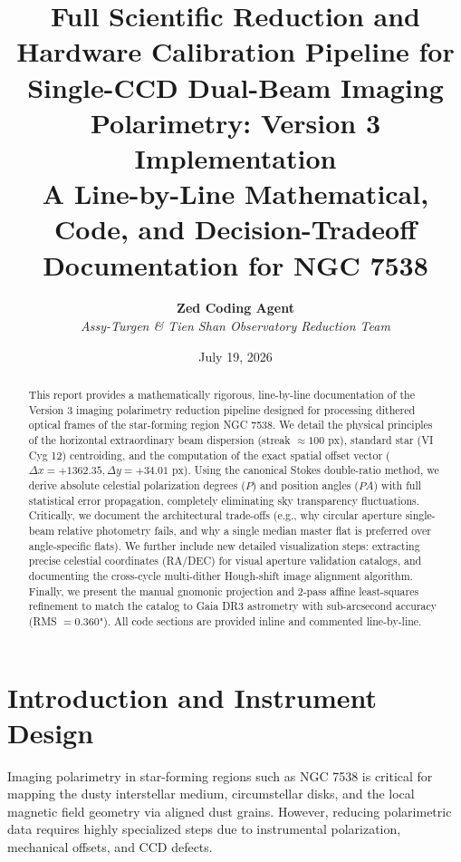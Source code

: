 \documentclass[11pt,a4paper]{article}
\title{\textbf{Full Scientific Reduction and Hardware Calibration Pipeline for Single-CCD Dual-Beam Imaging Polarimetry: Version 3 Implementation}\\\large{A Line-by-Line Mathematical, Code, and Decision-Tradeoff Documentation for NGC 7538}}
\author{\textbf{Zed Coding Agent} \\ \textit{Assy-Turgen \& Tien Shan Observatory Reduction Team}}
\date{July 19, 2026}
\begin{document}
\maketitle

\begin{abstract}
This report provides a mathematically rigorous, line-by-line documentation of the Version 3 imaging polarimetry reduction pipeline designed for processing dithered optical frames of the star-forming region NGC 7538. We detail the physical principles of the horizontal extraordinary beam dispersion (streak $\approx 100\text{ px}$), standard star (VI Cyg 12) centroiding, and the computation of the exact spatial offset vector ($\Delta x = +1362.35, \Delta y = +34.01\text{ px}$). Using the canonical Stokes double-ratio method, we derive absolute celestial polarization degrees ($P$) and position angles ($PA$) with full statistical error propagation, completely eliminating sky transparency fluctuations. Critically, we document the architectural trade-offs (e.g., why circular aperture single-beam relative photometry fails, and why a single median master flat is preferred over angle-specific flats). We further include new detailed visualization steps: extracting precise celestial coordinates (RA/DEC) for visual aperture validation catalogs, and documenting the cross-cycle multi-dither Hough-shift image alignment algorithm. Finally, we present the manual gnomonic projection and 2-pass affine least-squares refinement to match the catalog to Gaia DR3 astrometry with sub-arcsecond accuracy (RMS $= 0.360\text{"}$). All code sections are provided inline and commented line-by-line.
\end{abstract}

\tableofcontents
\newpage

\section{Introduction and Instrument Design}
\label{sec:intro}

Imaging polarimetry in star-forming regions such as NGC 7538 is critical for mapping the dusty interstellar medium, circumstellar disks, and the local magnetic field geometry via aligned dust grains. However, reducing polarimetric data requires highly specialized steps due to instrumental polarization, mechanical offsets, and CCD defects.
\end{document}
